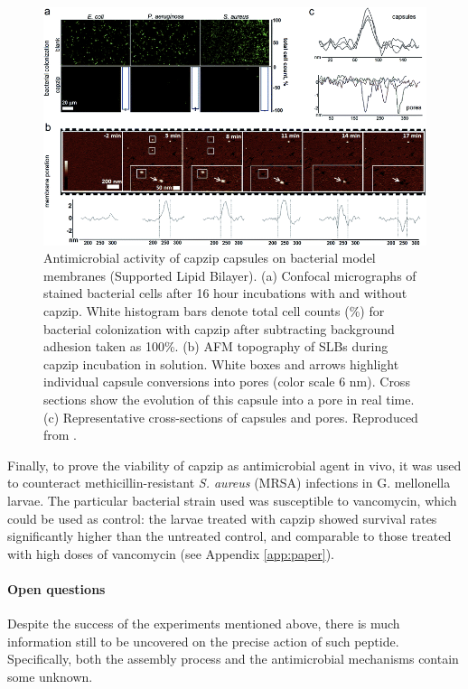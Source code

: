 \begin{figure}
\begin{center}
\includegraphics[width=0.8\linewidth, align = c]{1introduction/pics/AFM_on_SLB}
\caption[Capzip experiments on Supported Lipid Bilayers]{Antimicrobial activity of capzip capsules on bacterial model membranes (Supported Lipid Bilayer). (a) Confocal micrographs of stained bacterial cells after 16 hour incubations with and without capzip. White histogram bars denote total cell counts (\%) for bacterial colonization with capzip after subtracting background adhesion taken as 100\%. (b) AFM topography of SLBs during capzip incubation in solution. White boxes and arrows highlight individual capsule conversions into pores (color scale 6 nm). Cross sections show the evolution of this capsule into a pore in real time. (c) Representative cross-sections of capsules and pores. Reproduced from \citet{Castelletto2016}.} \label{fig:exp_SLB}
\end{center}
\end{figure}

Finally, to prove the viability of capzip as antimicrobial agent in vivo, it was used to counteract methicillin-resistant \emph{S. aureus} (MRSA) infections in G. mellonella larvae. The particular bacterial strain used was susceptible to vancomycin, which could be used as control: the larvae treated with capzip showed survival rates significantly higher than the untreated control, and comparable to those treated with high doses of vancomycin \citep{Kepiro2019} (see Appendix \ref{app:paper}).



\paragraph{Open questions} Despite the success of the experiments mentioned above, there is much information still to be uncovered on the precise action of such peptide. 
%
Specifically, both the assembly process and the antimicrobial mechanisms contain some unknown.

